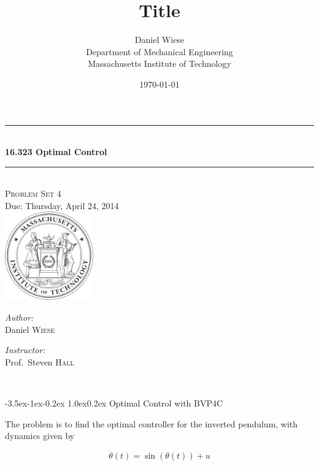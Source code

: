 \documentclass[11pt,letterpaper,onecolumn,notitlepage]{article}
\title{\textbf{Title}}
\author{Daniel Wiese \\ Department of Mechanical Engineering \\ Massachusetts Institute of Technology}
\date{\today}
\makeatletter
\renewcommand\section{\@startsection{section}{1}{\z@}%
{-3.5ex\@plus-1ex\@minus-0.2ex}%
{1.0ex\@plus0.2ex}%
{\fontsize{12pt}{12pt}\selectfont\bfseries\sffamily}}
\makeatother
\begin{document}
\begin{titlepage}
  \begin{center}
    \rule{\linewidth}{0.01in} \\[0.25in]
    {\huge\bfseries 16.323 Optimal Control}\\[0.4cm]
    \rule{\linewidth}{0.01in} \\[0.25in]

    \textsc{\LARGE Problem Set 4}\\[0.15in]
    \large Due: Thursday, April 24, 2014 \\[1.0in]
    \includegraphics[width=1.5in]{../fig/mit-seal.pdf}\\[3.0in]

    \begin{minipage}{0.4\textwidth}
      \begin{flushleft} \large
        \emph{Author:}\\
        Daniel \textsc{Wiese}
        \vfill
      \end{flushleft}
    \end{minipage}
    \begin{minipage}{0.4\textwidth}
      \begin{flushright} \large
        \emph{Instructor:} \\
        Prof.~Steven \textsc{Hall} \\
      \end{flushright}
    \end{minipage} \\
    \vfill
  \end{center}
\end{titlepage}

\clearpage
\section{Optimal Control with BVP4C}

The problem is to find the optimal controller for the inverted pendulum, with dynamics given by

\begin{equation*}
  \ddot{\theta}(t)=\sin(\theta(t))+u
\end{equation*}
\end{document}
